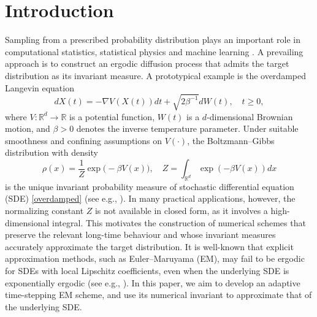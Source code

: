 \documentclass[preprint,12pt,compress]{elsarticle}
\begin{document}
\section{Introduction} \label{intro}
Sampling from a prescribed probability distribution plays an important role in
computational statistics, statistical physics and machine learning 
\cite{metropolis1953equation,geman1984stochastic,tierney1994markov,jones2022markov, heber2020posterior}.
A prevailing approach is to construct an ergodic diffusion process that admits the target distribution as its invariant measure.
A prototypical example is the overdamped Langevin equation
\begin{equation} \label{overdamped}
	dX(t) =  - \nabla V(X(t))dt + \sqrt {2{\beta ^{ - 1}}} dW(t), \quad t \ge 0,
\end{equation}
where $V:\mathbb{R}^d \to \mathbb{R}$ is a potential function, $W(t)$ is a $d$-dimensional Brownian motion, and $\beta >0$ denotes the inverse temperature parameter. Under suitable smoothness and confining assumptions on $V(\cdot)$, the Boltzmann--Gibbs distribution with density
\begin{equation}\label{Gibbs}
	\rho(x)=\frac{1}{Z}\exp\bigl(-\beta V(x)\bigr), \quad Z = \int_{{\mathbb{R}^d}} {\exp ( - \beta V(x))dx}
\end{equation}
is the unique invariant probability measure of stochastic differential equation (SDE) \eqref{overdamped} (see e.g., \cite[Proposition 4.2]{Pavliotis2014stochastic}). In many practical applications, however, the normalizing constant $Z$ is not available in closed form, as it involves a high-dimensional integral. 
This motivates the construction of numerical schemes that preserve the relevant long-time behaviour and whose invariant measures accurately approximate the target distribution. 
It is well-known that explicit approximation methods, such as Euler--Maruyama (EM), may fail to be ergodic for SDEs with local Lipschitz coefficients, even when the underlying SDE is exponentially ergodic (see e.g., \cite{roberts1996exponential, mattingly2002ergodicity}). In this paper, we aim to develop an adaptive time-stepping EM scheme, and use its numerical invariant to approximate that of the underlying SDE.
\end{document}
